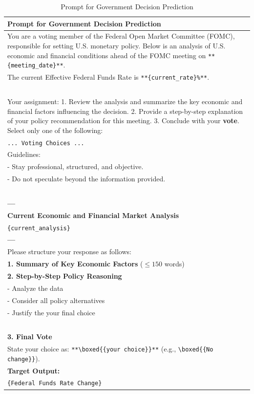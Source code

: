 \begin{table}[htp]
    \centering
    \footnotesize
    \begin{tabular}{p{}}
    \toprule
    \textbf{Prompt for Government Decision Prediction} \\
    \midrule
You are a voting member of the Federal Open Market Committee (FOMC), responsible for setting U.S. monetary policy. 
Below is an analysis of U.S. economic and financial conditions ahead of the FOMC meeting on \texttt{**\{meeting\_date\}**}.  \\
The current Effective Federal Funds Rate is \texttt{**\{current\_rate\}\%**}. \\
~\\
Your assignment:  
1. Review the analysis and summarize the key economic and financial factors influencing the decision.  
2. Provide a step-by-step explanation of your policy recommendation for this meeting.  
3. Conclude with your \textbf{vote}. Select only one of the following:  \\
\texttt{... Voting Choices ...}
~\\
Guidelines:  \\
- Stay professional, structured, and objective.  \\
- Do not speculate beyond the information provided. \\  
~\\
\textbf{---} \\
\textbf{Current Economic and Financial Market Analysis} \\
\texttt{\{current\_analysis\}} \\
\textbf{---} \\
Please structure your response as follows:  \\
\textbf{1. Summary of Key Economic Factors} (\(\leq 150\) words)  \\
\textbf{2. Step-by-Step Policy Reasoning}  \\
\hspace*{0.5cm} - Analyze the data  \\
\hspace*{0.5cm} - Consider all policy alternatives  \\
\hspace*{0.5cm} - Justify the your final choice \\
~\\
\textbf{3. Final Vote}  \\
State your choice as: \texttt{**\textbackslash boxed\{\{your choice\}\}**} (e.g., \texttt{\textbackslash boxed\{\{No change\}\}}). \\
    \bottomrule
    \toprule
\textbf{Target Output:} \\
\midrule
\texttt{\{Federal Funds Rate Change\}} \\
\bottomrule
    \end{tabular}
    \caption{Prompt for Government Decision Prediction}
    \label{tab:ch2:prompt_for_decision_prediction}
\end{table}








